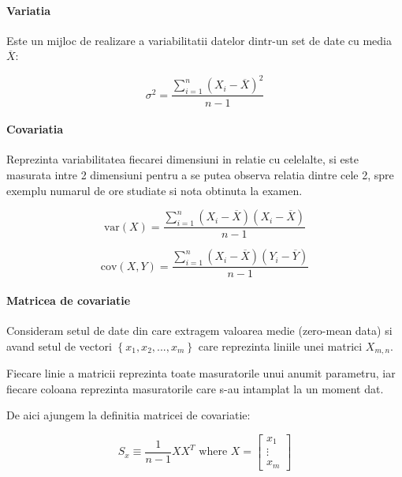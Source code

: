 \documentclass[12pt]{article}
\begin{document}
\paragraph{Variatia} Este un mijloc de realizare a variabilitatii datelor dintr-un set de date cu media $\overline{X}$:

\begin{equation}
\sigma^2=\frac{\sum_{i=1}^{n} \left( X_i - \overline{X} \right)^2 }{n-1}
\end{equation}

\paragraph{Covariatia} Reprezinta variabilitatea fiecarei dimensiuni in relatie cu celelalte, si este masurata intre 2 dimensiuni pentru a se putea observa relatia dintre cele 2, spre exemplu numarul de ore studiate si nota obtinuta la examen.

\begin{equation}
\text {var} \left( X \right) = \frac{\sum_{i=1}^{n} \left( X_i - \overline{X} \right) \left( X_i - \overline{X} \right) }{n-1}
\end{equation}


\begin{equation}
\text {cov} \left( X,Y \right) = \frac{\sum_{i=1}^{n} \left( X_i - \overline{X} \right) \left( Y_i - \overline{Y} \right) }{n-1}
\end{equation}


\paragraph{Matricea de covariatie}
Consideram setul de date din care extragem valoarea medie (zero-mean data) si avand setul de vectori \( \left\{ x_1, x_2, ..., x_m \right\} \) care reprezinta liniile unei matrici $X_{m,n}$.

Fiecare linie a matricii reprezinta toate masuratorile unui anumit parametru, iar fiecare coloana reprezinta masuratorile care s-au intamplat la un moment dat.

De aici ajungem la definitia matricei de covariatie:

\begin{equation}
S_x \equiv \frac{1}{n-1}XX^T \text { where } X = 
\begin{bmatrix}
x_1 \\ \vdots \\ x_m
\end{bmatrix}
\end{equation}
\end{document}
